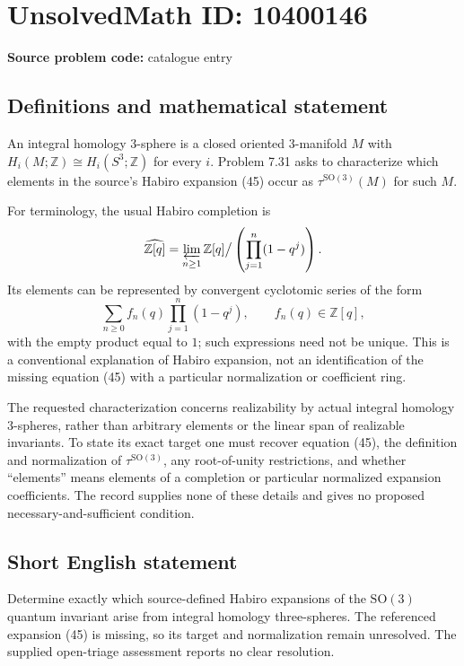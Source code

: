\documentclass[11pt]{article}
\newcommand{\Z}{\mathbb{Z}}
\begin{document}
\section*{UnsolvedMath ID: 10400146}
\textbf{Source problem code:} catalogue entry
\subsection{Definitions and mathematical statement}
An integral homology \(3\)-sphere is a closed oriented \(3\)-manifold \(M\) with \(H_i(M;\Z)\cong H_i(S^3;\Z)\) for every \(i\). Problem 7.31 asks to characterize which elements in the source's Habiro expansion (45) occur as \(\tau^{\mathrm{SO}(3)}(M)\) for such \(M\).

For terminology, the usual Habiro completion is
\[
 \widehat{\Z[q]}=\varprojlim_{n\ge1}
 \Z[q]\big/\left(\prod_{j=1}^{n}(1-q^j)\right).
\]
Its elements can be represented by convergent cyclotomic series of the form
\[
 \sum_{n\ge0} f_n(q)\prod_{j=1}^{n}(1-q^j),\qquad f_n(q)\in\Z[q],
\]
with the empty product equal to \(1\); such expressions need not be unique. This is a conventional explanation of Habiro expansion, not an identification of the missing equation (45) with a particular normalization or coefficient ring.

The requested characterization concerns realizability by actual integral homology \(3\)-spheres, rather than arbitrary elements or the linear span of realizable invariants. To state its exact target one must recover equation (45), the definition and normalization of \(\tau^{\mathrm{SO}(3)}\), any root-of-unity restrictions, and whether ``elements'' means elements of a completion or particular normalized expansion coefficients. The record supplies none of these details and gives no proposed necessary-and-sufficient condition.
\subsection{Short English statement}
Determine exactly which source-defined Habiro expansions of the \(\mathrm{SO}(3)\) quantum invariant arise from integral homology three-spheres. The referenced expansion (45) is missing, so its target and normalization remain unresolved. The supplied open-triage assessment reports no clear resolution.
\end{document}
